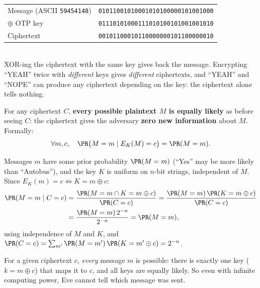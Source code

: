 \begin{exbox}[title=OTP on ``YEAH'']
\begin{tabular}{ll}
Message (ASCII \texttt{59454148}) & \texttt{01011001010001010100000101001000} \\
$\oplus$ OTP key                   & \texttt{01110101000111010100101001001010} \\ \hline
Ciphertext                         & \texttt{00101100010110000000101100000010}
\end{tabular} \\[4pt]
XOR-ing the ciphertext with the same key gives back the message. Encrypting ``YEAH''
twice with \emph{different} keys gives \emph{different} ciphertexts, and ``YEAH'' and
``NOPE'' can produce any ciphertext depending on the key: the ciphertext alone tells
nothing.
\end{exbox}

\begin{defnbox}[title=Perfect secrecy]
For any ciphertext $C$, \textbf{every possible plaintext $M$ is equally likely} as
before seeing $C$: the ciphertext gives the adversary \textbf{zero new information} about
$M$. Formally:
\[
  \forall m, c,\quad \PR\big(M = m \mid E_K(M) = c\big) = \PR(M = m).
\]
\end{defnbox}

\begin{proofbox}[title=The OTP is perfectly secure]
Messages $m$ have some prior probability $\PR(M = m)$ (``Yes'' may be more likely than
``Autobus''), and the key $K$ is uniform on $n$-bit strings, independent of $M$. Since
$E_K(m) = c \iff K = m \oplus c$:
\begin{align*}
  \PR(M = m \mid C = c)
  &= \frac{\PR(M = m \cap K = m \oplus c)}{\PR(C = c)}
   = \frac{\PR(M = m)\,\PR(K = m \oplus c)}{\PR(C = c)} \\
  &= \frac{\PR(M = m)\, 2^{-n}}{2^{-n}}
   = \PR(M = m),
\end{align*}
using independence of $M$ and $K$, and
$\PR(C = c) = \sum_{m'} \PR(M = m')\,\PR(K = m' \oplus c) = 2^{-n}$.
\end{proofbox}

\begin{rembox}[title=Intuition]
For a given ciphertext $c$, \emph{every} message $m$ is possible: there is exactly one key
($k = m \oplus c$) that maps it to $c$, and all keys are equally likely. So even with
infinite computing power, Eve cannot tell which message was sent.
\end{rembox}

